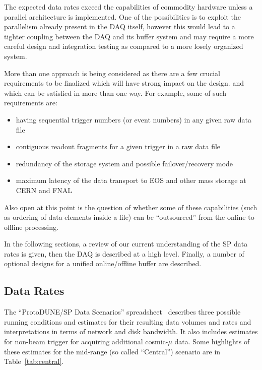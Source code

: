 \documentclass[pdftex,12pt,letter]{article}
\newcommand{\pd}{ProtoDUNE\xspace}
\begin{document}
The expected data rates exceed the capabilities of commodity hardware
unless a parallel architecture is implemented. One of the possibilities is to
exploit the parallelism already present in the DAQ itself, however this
would lead to a tighter coupling between the DAQ and its buffer system and
may require a more careful design and integration testing as compared to a more
losely organized system.

More than one approach is being considered as there are a few crucial
requirements to be finalized which will have strong impact on the design.
and which can be satisfied in more than one way. For example, some of such
requirements are:

\begin{itemize}

\item having sequential trigger numbers (or event numbers) in any given raw data file

\item contiguous readout fragments for a given trigger in a raw data file

\item redundancy of the storage system and possible failover/recovery mode

\item maximum latency of the data transport to EOS and other mass storage at CERN and FNAL

\end{itemize}

\noindent Also open at this point is the question of whether some of these capabilities (such as ordering of data elements
inside a file) can be ``outsourced'' from the online to offline processing.

In the following sections, a review of our current understanding of
the SP data rates is given, then the DAQ is described at a high level.
Finally, a number of optional designs for a unified online/offline
buffer are described.

\subsection{Data Rates}

The ``\pd/SP Data Scenarios'' spreadsheet~\cite{data-scenarios}
describes three possible running conditions and estimates for their
resulting data volumes and rates and interpretations in terms of
network and disk bandwidth.  It also includes estimates for non-beam
trigger for acquiring additional cosmic-$\mu$ data.  Some highlights
of these estimates for the mid-range (so called ``Central'')
scenario are in Table~\ref{tab:central}.
\end{document}
